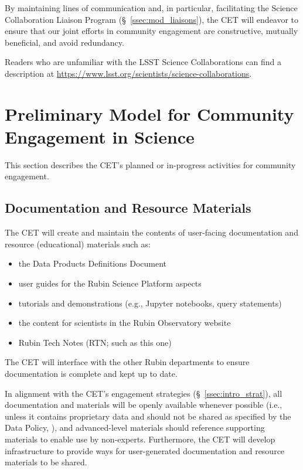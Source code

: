 \documentclass[DM,lsstdraft,toc]{lsstdoc}
\begin{document}
By maintaining lines of communication and, in particular, facilitating the Science Collaboration Liaison Program (\S~\ref{ssec:mod_liaisons}), the CET will endeavor to ensure that our joint efforts in community engagement are constructive, mutually beneficial, and avoid redundancy.

Readers who are unfamiliar with the LSST Science Collaborations can find a description at \url{https://www.lsst.org/scientists/science-collaborations}.


\section{Preliminary Model for Community Engagement in Science}\label{sec:mod}

This section describes the CET's planned or in-progress activities for community engagement. 


\subsection{Documentation and Resource Materials}\label{ssec:mod_docs}

The CET will create and maintain the contents of user-facing documentation and resource (educational) materials such as:
\begin{itemize}
\item the Data Products Definitions Document 
\item user guides for the Rubin Science Platform aspects
\item tutorials and demonstrations (e.g., Jupyter notebooks, query statements)
\item the content for scientists in the Rubin Observatory website
\item Rubin Tech Notes (RTN; such as this one)
\end{itemize}

The CET will interface with the other Rubin departments to ensure documentation is complete and kept up to date.

In alignment with the CET's engagement strategies (\S~\ref{ssec:intro_strat}), all documentation and materials will be openly available whenever possible (i.e., unless it contains proprietary data and should not be shared as specified by the Data Policy, ), and advanced-level materials should reference supporting materials to enable use by non-experts.
Furthermore, the CET will develop infrastructure to provide ways for user-generated documentation and resource materials to be shared.
\end{document}
